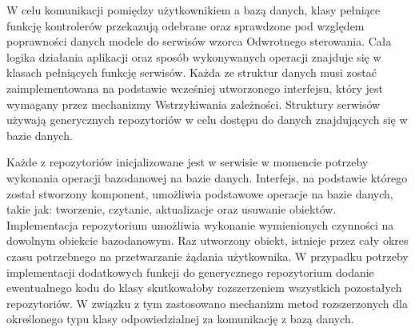 {W celu komunikacji pomiędzy użytkownikiem a bazą danych, klasy pełniące funkcję kontrolerów przekazują odebrane oraz sprawdzone pod względem poprawności danych modele do serwisów wzorca Odwrotnego sterowania. Cała logika działania aplikacji oraz sposób wykonywanych operacji znajduje się w klasach pełniących funkcję serwisów.
 Każda ze struktur danych musi zostać zaimplementowana na podstawie wcześniej utworzonego interfejsu, który jest wymagany przez mechanizmy Wstrzykiwania zależności. Struktury serwisów używają generycznych repozytoriów w celu dostępu do danych znajdujących się w bazie danych. 
 
 Każde z repozytoriów inicjalizowane jest w serwisie w momencie potrzeby wykonania operacji bazodanowej na bazie danych. Interfejs, na podstawie którego został stworzony komponent, umożliwia podstawowe operacje na bazie danych, takie jak: tworzenie, czytanie, aktualizacje oraz usuwanie obiektów. Implementacja repozytorium umożliwia wykonanie wymienionych czynności na dowolnym obiekcie bazodanowym. Raz utworzony obiekt, istnieje przez cały okres czasu potrzebnego na przetwarzanie żądania użytkownika. W przypadku potrzeby implementacji dodatkowych funkcji do generycznego repozytorium dodanie ewentualnego kodu do klasy skutkowałoby rozszerzeniem wszystkich pozostałych repozytoriów. W związku z tym zastosowano mechanizm metod rozszerzonych dla określonego typu klasy odpowiedzialnej za komunikację z bazą danych. }
\\
\begin{center}

\end{center}

